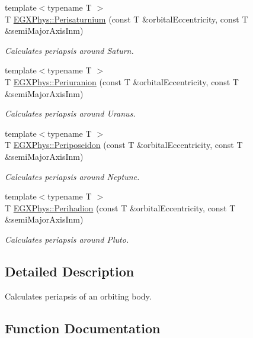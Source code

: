 \begin{DoxyCompactItemize}
{\footnotesize template$<$typename T $>$ }\\T \mbox{\hyperlink{group___e_g_x_phys-_periapsis_ga9e41853412b564c33a192f7335e4f6fe}{E\+G\+X\+Phys\+::\+Perisaturnium}} (const T \&orbital\+Eccentricity, const T \&semi\+Major\+Axis\+Inm)
\begin{DoxyCompactList}\small\item\em Calculates periapsis around Saturn. \end{DoxyCompactList}\item 
{\footnotesize template$<$typename T $>$ }\\T \mbox{\hyperlink{group___e_g_x_phys-_periapsis_ga655892453dddf80d0e60c66c1b8279fd}{E\+G\+X\+Phys\+::\+Periuranion}} (const T \&orbital\+Eccentricity, const T \&semi\+Major\+Axis\+Inm)
\begin{DoxyCompactList}\small\item\em Calculates periapsis around Uranus. \end{DoxyCompactList}\item 
{\footnotesize template$<$typename T $>$ }\\T \mbox{\hyperlink{group___e_g_x_phys-_periapsis_ga6f36f302670235e04ff91169dde59dbf}{E\+G\+X\+Phys\+::\+Periposeidon}} (const T \&orbital\+Eccentricity, const T \&semi\+Major\+Axis\+Inm)
\begin{DoxyCompactList}\small\item\em Calculates periapsis around Neptune. \end{DoxyCompactList}\item 
{\footnotesize template$<$typename T $>$ }\\T \mbox{\hyperlink{group___e_g_x_phys-_periapsis_ga1b844386674d15f7dc768f81b5770b93}{E\+G\+X\+Phys\+::\+Perihadion}} (const T \&orbital\+Eccentricity, const T \&semi\+Major\+Axis\+Inm)
\begin{DoxyCompactList}\small\item\em Calculates periapsis around Pluto. \end{DoxyCompactList}\end{DoxyCompactItemize}


\subsection{Detailed Description}
Calculates periapsis of an orbiting body. 

\subsection{Function Documentation}
\mbox{\label{group___e_g_x_phys-_periapsis_gad487212733711bc2ce73c8137c9309c3}} 
